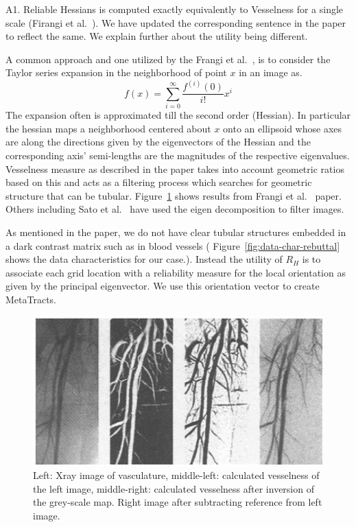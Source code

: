 \documentclass[]{article}
\begin{document}
A1. Reliable Hessians is computed exactly equivalently to Vesselness for a single scale (Firangi et al.~\cite{Frangi1998}). We have  updated the corresponding sentence in the paper to reflect the same. We explain further about the utility being different.


A common approach and one utilized by the Frangi et al.~\cite{Frangi1998}, is to consider the Taylor series expansion in the neighborhood of point $x$ in an image as.
\begin{equation}
f(x) = \sum_{i=0}^{\infty}\frac{f^{(i)}(0)}{i!}x^{i}
\end{equation}
The expansion often is approximated till the second order (Hessian). In particular the hessian maps a  neighborhood  centered about $x$ onto an ellipsoid  whose axes are along the directions given by the eigenvectors of the Hessian and the corresponding axis' semi-lengths are the magnitudes of the respective eigenvalues. Vesselness measure as described in the paper takes into account geometric ratios based on this and acts as a filtering process which searches for geometric structure that can be tubular. Figure~\ref{fig:Vesselness} shows results from Frangi et al.~\cite{Frangi1998} paper. Others including Sato et al.~\cite{Sato1997} have used the eigen decomposition to filter images.

As mentioned in the paper, we do not have clear tubular structures embedded in a dark contrast matrix such as in blood vessels ( Figure~\ref{fig:data-char-rebuttal} shows the data characteristics for our case.). Instead  the utility of $R_{H}$ is  to associate each grid location with a reliability measure for the local orientation as given by the  principal eigenvector. We use this orientation vector to create MetaTracts.

\begin{figure}
\centering
\includegraphics[width=0.7\linewidth]{images_pvis/Vesselness}
\caption{Left: Xray image of vasculature, middle-left: calculated vesselness of the left image, middle-right: calculated vesselness after inversion of the grey-scale map. Right image after subtracting reference from left image.}
\label{fig:Vesselness}
\end{figure}
\end{document}
